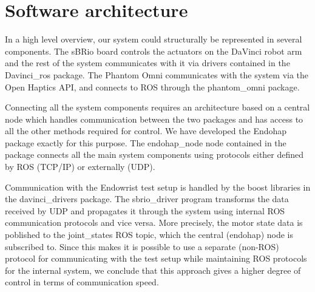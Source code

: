 \section{Software architecture}





In a high level overview, our system could structurally be represented in several components.
The sBRio board controls the actuators on the DaVinci robot arm and the rest of the system communicates with it via drivers contained in the Davinci\_ros package. The Phantom Omni communicates with the system via the Open Haptics API, and connects to ROS through the phantom\_omni package.

Connecting all the system components requires an architecture based on a central node which handles communication between the two packages and has access to all the other methods required for control.
We have developed the Endohap package exactly for this purpose.
The endohap\_node node contained in the package connects all the main system components using protocols either defined by ROS (TCP/IP) or externally (UDP). 

Communication with the Endowrist test setup is handled by the boost libraries in the davinci\_drivers package. 
The sbrio\_driver program transforms the data received by UDP and propagates it through the system using internal ROS communication protocols and vice versa. 
More precisely, the motor state data is poblished to the joint\_states ROS topic, which the central (endohap) node is subscribed to.
Since this makes it is possible to use a separate (non-ROS) protocol for communicating with the test setup while maintaining ROS protocols for the internal system, we conclude that this approach gives a higher degree of control in terms of communication speed.

